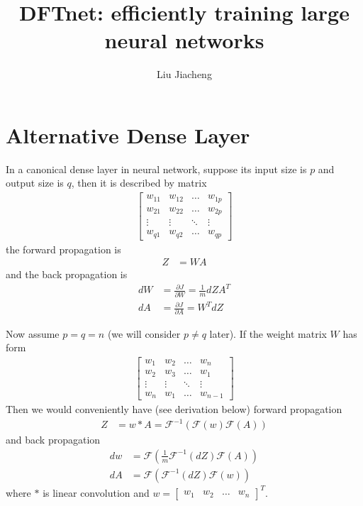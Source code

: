 \documentclass[12pt]{article}
\title{DFTnet: efficiently training large neural networks}
\author{Liu Jiacheng}
\begin{document}
\maketitle

\section{Alternative Dense Layer}

In a canonical dense layer in neural network, suppose its input size is $p$ and output size is $q$, then it is described by matrix
\begin{align*}
	\begin{bmatrix}
		w_{11} & w_{12} & \hdots & w_{1p} \\
		w_{21} & w_{22} & \hdots & w_{2p} \\
		\vdots & \vdots & \ddots & \vdots \\
		w_{q1} & w_{q2} & \hdots & w_{qp}
	\end{bmatrix}
\end{align*}
the forward propagation is
\begin{align*}
	Z &= W A
\end{align*}
and the back propagation is
\begin{align*}
	dW &= \frac{\partial{J}}{\partial{W}} = \frac{1}{m} dZ A^T \\
	dA &= \frac{\partial{J}}{\partial{A}} = W^T dZ
\end{align*}

Now assume $p=q=n$ (we will consider $p \neq q$ later). If the weight matrix $W$ has form
\begin{align*}
	\begin{bmatrix}
		w_1 & w_2 & \hdots & w_n \\
		w_2 & w_3 & \hdots & w_1 \\
		\vdots & \vdots & \ddots & \vdots \\
		w_n & w_1 & \hdots & w_{n-1}
	\end{bmatrix}
\end{align*}
Then we would conveniently have (see derivation below) forward propagation
\begin{align*}
	Z &= w * A = \mathscr{F}^{-1}(\mathscr{F}(w) \mathscr{F}(A))
\end{align*}
and back propagation
\begin{align*}
	dw &= \mathscr{F}(\frac{1}{m} \mathscr{F}^{-1}(dZ) \mathscr{F}(A)) \\
	dA &= \mathscr{F}(\mathscr{F}^{-1}(dZ) \mathscr{F}(w))
\end{align*}
where $*$ is linear convolution and $w = \begin{bmatrix} w_1 & w_2 & \hdots & w_n \end{bmatrix}^T$. 
\end{document}
